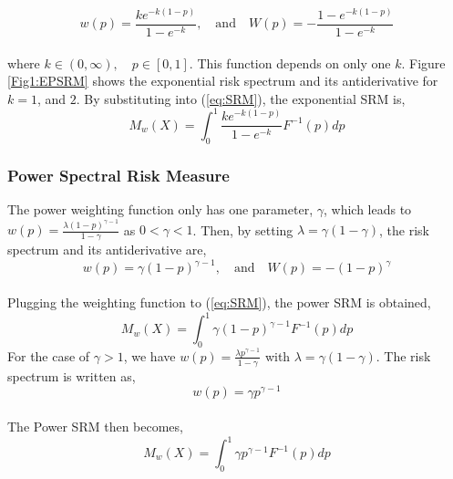 \documentclass[11pt,a4paper,english]{article}
\begin{document}
\begin{equation}\label{eq:w}
 w(p)=\frac{ke^{-k(1-p)}}{1-e^{-k}},\quad \mbox{and} \quad  W(p)=-\frac{1-e^{-k(1-p)}}{1-e^{-k}}
\end{equation}\\

\noindent where $k \in (0, \infty),\quad p\in [0, 1]$. This function depends on only one $k$. Figure \ref{Fig1:EPSRM} shows the exponential risk spectrum and its antiderivative for $k=1$, and $2$. By substituting into (\ref{eq:SRM}), the exponential SRM is, 
\begin{equation}\label{eq:ESRM}
 M_{w}(X)= \int^1_{0} \frac{ke^{-k(1-p)}}{1-e^{-k}}F^{-1}(p)dp
\end{equation}

\subsubsection{Power Spectral Risk Measure}
The power weighting function only has one parameter, $\gamma$, which leads to $w(p)= \frac{\lambda (1-p)^{\gamma-1}}{1-\gamma}$ as $0<\gamma<1$. Then, by setting $\lambda =\gamma(1-\gamma)$, the risk spectrum and its antiderivative are, 
\begin{equation}\label{eq:wp}
 w(p)=\gamma(1-p)^{\gamma-1},\quad \mbox{and} \quad  W(p)=-(1-p)^{\gamma}
 \end{equation}\\
  Plugging the weighting function to (\ref{eq:SRM}), the power SRM is obtained,
 \begin{equation}\label{eq:PSRM}
 M_{w}(X)= \int^1_{0} \gamma(1-p)^{\gamma-1}F^{-1}(p)dp
\end{equation}
 For the case of $\gamma >1$, we have $w(p)= \frac{\lambda p^{\gamma-1}}{1-\gamma}$ with $\lambda =\gamma(1-\gamma)$. The risk spectrum is written as, 
\begin{equation}\label{eq:wp2}
 w(p)= \gamma p^{\gamma-1} 
\end{equation}\\
The Power SRM then becomes,
\begin{equation}\label{eq:PSRM2}
 M_{w}(X)= \int^1_{0} \gamma p^{\gamma-1}F^{-1}(p)dp
 \end{equation}\\
\end{document}
